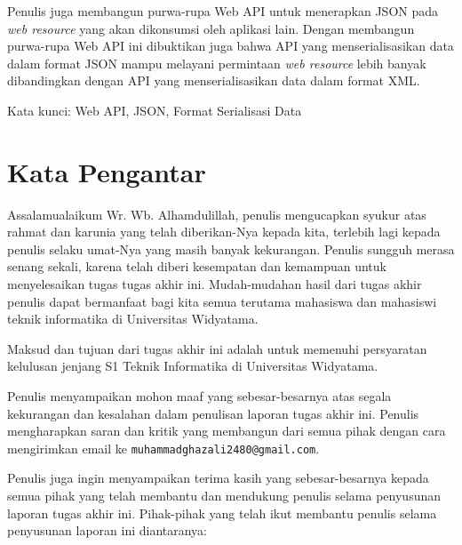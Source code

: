 \documentclass[a4paper, 12pt, oneside]{report}
\begin{document}
\onehalfspacing Penulis juga membangun purwa-rupa Web API untuk menerapkan JSON pada \textit{web resource} yang akan dikonsumsi oleh aplikasi lain. Dengan membangun purwa-rupa Web API ini dibuktikan juga bahwa API yang menserialisasikan data dalam format JSON mampu melayani permintaan \textit{web resource} lebih banyak dibandingkan dengan API yang menserialisasikan data dalam format XML.

\begin{flushleft}
\onehalfspacing Kata kunci: Web API, JSON, Format Serialisasi Data
\end{flushleft}

\chapter*{Kata Pengantar}

\onehalfspacing Assalamualaikum Wr. Wb. Alhamdulillah, penulis mengucapkan syukur atas rahmat dan karunia yang telah diberikan-Nya kepada kita, terlebih lagi kepada penulis selaku umat-Nya yang masih banyak kekurangan. Penulis sungguh merasa senang sekali, karena telah diberi kesempatan dan kemampuan untuk menyelesaikan tugas tugas akhir ini. Mudah-mudahan hasil dari tugas akhir penulis dapat bermanfaat bagi kita semua terutama mahasiswa dan mahasiswi teknik informatika di Universitas Widyatama.

\onehalfspacing Maksud dan tujuan dari tugas akhir ini adalah untuk memenuhi persyaratan kelulusan jenjang S1 Teknik Informatika di Universitas Widyatama.

\onehalfspacing Penulis menyampaikan mohon maaf yang sebesar-besarnya atas segala kekurangan dan kesalahan dalam penulisan laporan tugas akhir ini. Penulis mengharapkan saran dan kritik yang membangun dari semua pihak dengan cara mengirimkan email ke \texttt{muhammadghazali2480@gmail.com}.

\onehalfspacing Penulis juga ingin menyampaikan terima kasih yang sebesar-besarnya kepada semua pihak yang telah membantu dan mendukung penulis selama
penyusunan laporan tugas akhir ini. Pihak-pihak yang telah ikut membantu penulis selama penyusunan laporan ini diantaranya:
\end{document}
